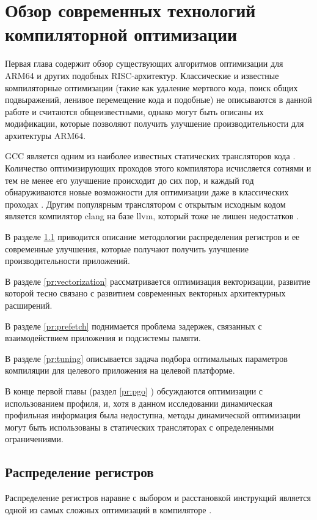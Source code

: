 \chapter{Обзор современных технологий компиляторной оптимизации}\label{ch:chReview}
Первая глава содержит обзор существующих алгоритмов оптимизации для ARM64 и других  подобных  RISC-архитектур. Классические и известные компиляторные оптимизации (такие как удаление мертвого кода, поиск общих подвыражений, ленивое перемещение кода и подобные) не описываются в данной работе и считаются общеизвестными, однако могут быть описаны их модификации, которые позволяют получить улучшение производительности для архитектуры ARM64. 

GCC является одним из наиболее известных статических трансляторов кода \cite{gough2004introduction}. Количество оптимизирующих проходов этого компилятора исчисляется сотнями и тем не менее его улучшение происходит до сих пор, и каждый год обнаруживаются новые возможности для оптимизации даже в классических проходах \cite{theodoridis2022finding}. Другим популярным транслятором с открытым исходным кодом является  компилятор clang на базе llvm, который тоже не лишен недостатков \cite{zhou2021empirical}.

В разделе \ref{pr:regalloc} приводится описание методологии распределения регистров и ее современные улучшения, которые получают получить улучшение производительности приложений.

В разделе \ref{pr:vectorization} рассматривается оптимизация векторизации, развитие которой тесно связано с развитием современных векторных архитектурных расширений.

В разделе \ref{pr:prefetch} поднимается проблема задержек, связанных с  взаимодействием приложения и подсистемы памяти.

В разделе \ref{pr:tuning} описывается задача подбора оптимальных параметров компиляции для целевого приложения на целевой платформе.

В конце первой главы (раздел \ref{pr:pgo} ) обсуждаются оптимизации с использованием профиля, и, хотя в данном исследовании динамическая профильная информация была недоступна, методы динамической оптимизации могут быть использованы в статических трансляторах с определенными ограничениями.

\section{Распределение регистров} \label{pr:regalloc}
Распределение регистров наравне с выбором и расстановкой инструкций является одной из самых сложных оптимизаций в компиляторе \cite{lozano2019survey, alfred2007compilers}. 

